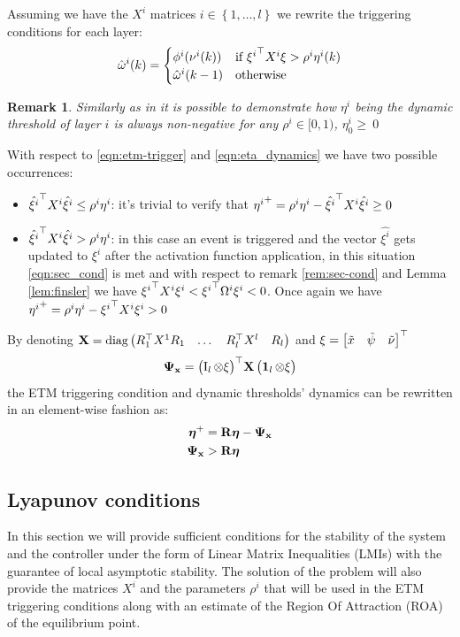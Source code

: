 \documentclass{ifacconf}
\theoremstyle{plain}
\newtheorem{remark}{Remark}
\begin{document}
Assuming we have the $X^i$ matrices $i \in \left\{1, \dots, l \right\}$ we rewrite the triggering conditions for each layer:
\begin{equation}\label{eqn:etm-trigger}
  \hat{\omega}^{i}(k) = \begin{cases}
    \phi^i(\nu^i(k)) & \text{if } {\xi^i}^\top X^i \xi > \rho^i \eta^i(k)\\
    \hat{\omega}^{i}(k-1) & \text{otherwise}
  \end{cases}
\end{equation}
\begin{remark}\label{rem:eta-positive} \emph{Similarly as in \citep[Lemma 3]{data-driven} it is possible to demonstrate how $\eta^i$ being the dynamic threshold of layer $i$ is always non-negative for any $\rho^i \in [0, 1)$, $\eta^i_0 \geq\ 0$} \end{remark}
With respect to \eqref{eqn:etm-trigger} and \eqref{eqn:eta_dynamics} we have two possible occurrences:
\begin{itemize}
    \item $\hat{{\xi^i}}^\top X^i \hat{\xi^i} \leq \rho^i \eta^i$: it's trivial to verify that ${\eta^i}^+ = \rho^i \eta^i - \hat{{\xi^i}}^\top X^i \hat{\xi^i} \geq 0 $
    \item $\hat{\xi^i}^\top X^i \hat{\xi^i} > \rho^i \eta^i$: in this case an event is triggered and the vector $\hat{\xi^i}$ gets updated to $\xi^i$ after the activation function application, in this situation \eqref{eqn:sec_cond} is met and with respect to remark \ref{rem:sec-cond} and Lemma \ref{lem:finsler} we have ${\xi^i}^\top X^i \xi^i < {\xi^i}^\top \Omega^i \xi^i < 0$. Once again we have ${\eta^i}^+ = \rho^i \eta^i - {\xi^i}^\top X^i \xi^i > 0 $
\end{itemize}
By denoting ${\bf{X}} = \text{diag} \left(\begin{matrix}R_1^\top X^1 R_1 & \dots & R_l^\top X^l & R_l\end{matrix}\right) $ and $\xi = \left[\begin{matrix}\tilde{x} & \tilde{\psi} & \tilde{\nu}\end{matrix}\right]^\top$
$$
\mathbf{\Psi_x} = \left(\begin{matrix}\operatorname{I}_l \otimes \xi\end{matrix}\right)^\top\! {\bf{X}} \left(\begin{matrix}\operatorname{\mathbf{1}}_l \otimes \xi\end{matrix}\right)
$$
the ETM triggering condition and dynamic thresholds' dynamics can be rewritten in an element-wise fashion as:
\begin{equation}
\begin{aligned}
    \boldsymbol{\eta}^+ &= {\bf{R}} \boldsymbol{\eta} - \mathbf{\Psi_x}\\
    \mathbf{\Psi_x} &> {\bf{R}} \boldsymbol{\eta}\end{aligned}
\end{equation}

\subsection{Lyapunov conditions}
In this section we will provide sufficient conditions for the stability of the system and the controller under the form of Linear Matrix Inequalities (LMIs) with the guarantee of local asymptotic stability. The solution of the problem will also provide the matrices $X^i$ and the parameters $\rho^i$ that will be used in the ETM triggering conditions along with an estimate of the Region Of Attraction (ROA) of the equilibrium point. 
\end{document}
